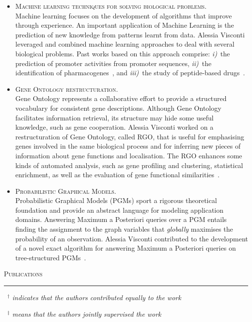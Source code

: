 \documentclass[a4paper,10pt]{article}
\newcommand{\mediumtitle}[1]{
	\vspace{0.2cm}
	{\noindent
	\Large \textsc{#1}\\[-2ex]
	\hrule
	\vspace{0.2cm}}
}
\newcommand{\smalltitle}[1]{
	\vspace{0.1cm}
	{\noindent 
	\large \textsc{#1}}
	\vspace{0.1cm}
}
\newcommand{\bulletitem}{\item[$\bullet$]}
\begin{document}
\begin{itemize}
\bulletitem \smalltitle{Machine learning techniques for solving biological problems.}\\
Machine learning focuses on the development of algorithms that improve through experience. An important application of Machine Learning  is the prediction of new knowledge from patterns learnt from data. 
Alessia Visconti leveraged and combined machine learning approaches to deal with several biological problems. Past works based on this approach comprise: \emph{i)}~the prediction of promoter activities from promoter sequences, \emph{ii)}~the identification of pharmacogenes~\cite{Vis12a, Vis12b}, and \emph{iii)}~the study of peptide-based drugs~\cite{Erm14, Vis15a, Erm13a}.

\bulletitem \smalltitle{Gene Ontology restructuration.} \\
Gene Ontology represents a collaborative effort to provide a structured vocabulary for consistent gene descriptions. Although Gene Ontology facilitates information retrieval, its structure may hide some useful knowledge, such as gene cooperation.
Alessia Visconti worked on a restructuration of Gene Ontology, called RGO, that is useful for emphasising genes involved in the same biological process and for inferring new pieces of information about gene functions and localisation. The RGO enhances some kinds of automated analysis, such as gene profiling and clustering, statistical enrichment, as well as the evaluation of gene functional similarities~\cite{Vis11a, Vis10a, Vis12b}.

\bulletitem \smalltitle{Probabilistic Graphical Models.}\\
Probabilistic Graphical Models (PGMs) sport a rigorous theoretical foundation and provide an abstract language for modeling application domains. Answering Maximum a Posteriori queries over a PGM entails finding the assignment to the graph variables that \emph{globally} maximises the probability of an observation. 
Alessia Visconti contributed to the development of a novel exact algorithm for answering Maximum a Posteriori queries on tree-structured PGMs~\cite{Esp13}.

\end{itemize}


\newpage


\mediumtitle{Publications}

{\footnotesize 
\noindent \emph{~$^{\textbf{$\dag $}}$ indicates that the authors contributed equally to the work}

\noindent \emph{~$^{\textbf{$\ddag $}}$ means that the authors jointly supervised the work}
}
\end{document}
